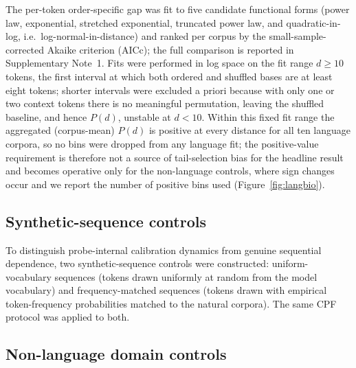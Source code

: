 \documentclass[11pt]{article}
\begin{document}
The per-token order-specific gap was fit to five candidate functional forms (power law,
exponential, stretched exponential, truncated power law, and quadratic-in-log,
i.e.\ log-normal-in-distance) and ranked per corpus by the small-sample-corrected Akaike
criterion (AICc); the full comparison is reported in Supplementary Note~1. Fits were performed
in log space on the fit range $d \geq 10$ tokens, the first interval at which both ordered and
shuffled bases are at least eight tokens; shorter intervals were excluded a priori because with
only one or two context tokens there is no meaningful permutation, leaving the shuffled baseline,
and hence $P(d)$, unstable at $d < 10$. Within this fixed fit range the aggregated (corpus-mean)
$P(d)$ is positive at every distance for all ten language corpora, so no bins were dropped from any
language fit; the positive-value requirement is therefore not a source of tail-selection bias for
the headline result and becomes operative only for the non-language controls, where sign changes
occur and we report the number of positive bins used (Figure~\ref{fig:langbio}).

\subsection{Synthetic-sequence controls}

To distinguish probe-internal calibration dynamics from genuine sequential dependence, two
synthetic-sequence controls were constructed: uniform-vocabulary sequences (tokens drawn uniformly
at random from the model vocabulary) and frequency-matched sequences (tokens drawn with empirical
token-frequency probabilities matched to the natural corpora). The same CPF
protocol was applied to both.

\subsection{Non-language domain controls}
\end{document}
